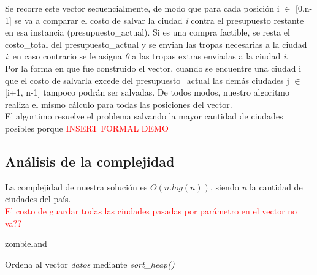 \documentclass[a4paper]{article}
\begin{document}
 Se recorre este vector secuencialmente, de modo que para cada posici\'on i $\in$ [0,n-1] se va a comparar el costo de salvar la ciudad \emph{i} contra el presupuesto restante en esa instancia (presupuesto_actual). Si es una compra factible, se resta el costo_total del presupuesto_actual y se envian las tropas necesarias a la ciudad \emph{i}; en caso contrario se le asigna \emph{0} a las tropas extras enviadas a la ciudad \emph{i}. \\
 
 Por la forma en que fue construido el vector, cuando se encuentre una ciudad i que el costo de salvarla excede del presupuesto_actual las dem\'as ciudades j $\in$ [i+1, n-1] tampoco podr\'an ser salvadas. De todos modos, nuestro algoritmo realiza el mismo c\'alculo para todas las posiciones del vector.\\
 

El algortimo resuelve el problema salvando la mayor cantidad de ciudades posibles porque
\textcolor{red}{INSERT FORMAL DEMO}

\newpage
\subsection{An\'alisis de la complejidad}
La complejidad de nuestra soluci\'on es $O(n.log(n))$, siendo \emph{n} la cantidad de ciudades del pa\'is.\\



\textcolor{red}{El costo de guardar todas las ciudades pasadas por par\'ametro en el vector no va??}\\

\begin{algorithm}[h!]
\caption{zombieland}
Ordena al vector \emph{datos} mediante \textit{sort_heap()}\\
\end{algorithm}
\end{document}
